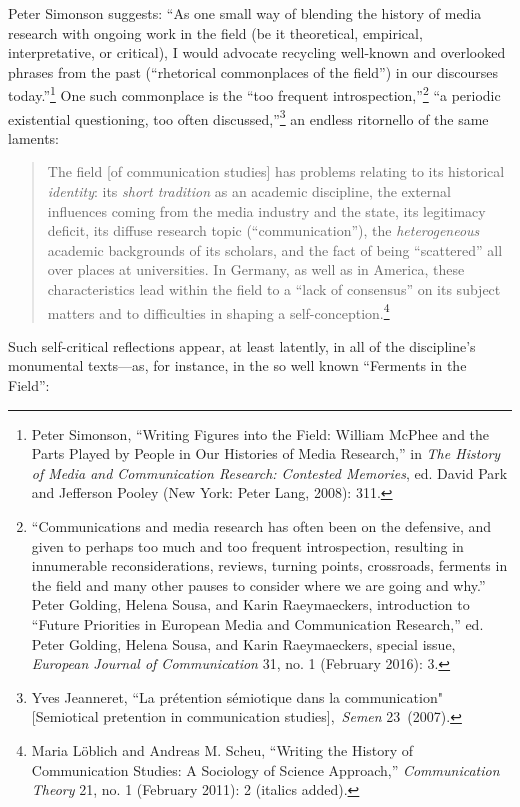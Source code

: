 \documentclass{tufte-handout}
\begin{document}
Peter Simonson suggests: ``As one small way of blending the history of
media research with ongoing work in the field (be it theoretical,
empirical, interpretative, or critical), I would advocate recycling
well-known and overlooked phrases from the past (``rhetorical
commonplaces of the field'') in our discourses today.''\footnote{Peter
  Simonson, ``Writing Figures into the Field: William McPhee and the
  Parts Played by People in Our Histories of Media Research,'' in
  \emph{The History of Media and Communication Research: Contested
  Memories}, ed. David Park and Jefferson Pooley (New York: Peter Lang,
  2008): 311.} One such commonplace is the ``too frequent
introspection,''\footnote{``Communications and media research has often
  been on the defensive, and given to perhaps too much and too frequent
  introspection, resulting in innumerable reconsiderations, reviews,
  turning points, crossroads, ferments in the field and many other
  pauses to consider where we are going and why.'' Peter Golding, Helena
  Sousa, and Karin Raeymaeckers, introduction to ``Future Priorities in
  European Media and Communication Research,'' ed. Peter Golding, Helena
  Sousa, and Karin Raeymaeckers, special issue, \emph{European Journal
  of Communication} 31, no. 1 (February 2016): 3.} ``a periodic
existential questioning, too often discussed,''\footnote{Yves Jeanneret,
  ``La prétention sémiotique dans la communication" {[}Semiotical
  pretention in communication studies{]},~\emph{Semen} 23~(2007).} an
endless ritornello of the same laments:

\begin{quote}
The field {[}of communication studies{]} has problems relating to its
historical \emph{identity}: its \emph{short tradition} as an academic
discipline, the external influences coming from the media industry and
the state, its legitimacy deficit, its diffuse research topic
(``communication''), the \emph{heterogeneous} academic backgrounds of
its scholars, and the fact of being ``scattered'' all over places at
universities. In Germany, as well as in America, these characteristics
lead within the field to a ``lack of consensus'' on its subject matters
and to difficulties in shaping a self-conception.\footnote{Maria Löblich
  and Andreas M. Scheu, ``Writing the History of Communication Studies:
  A Sociology of Science Approach,'' \emph{Communication Theory} 21, no.
  1 (February 2011): 2 (italics added).}
\end{quote}

\noindent Such self-critical reflections appear, at least latently, in all of the
discipline's monumental texts---as, for instance, in the so well known
``Ferments in the Field'':
\end{document}
